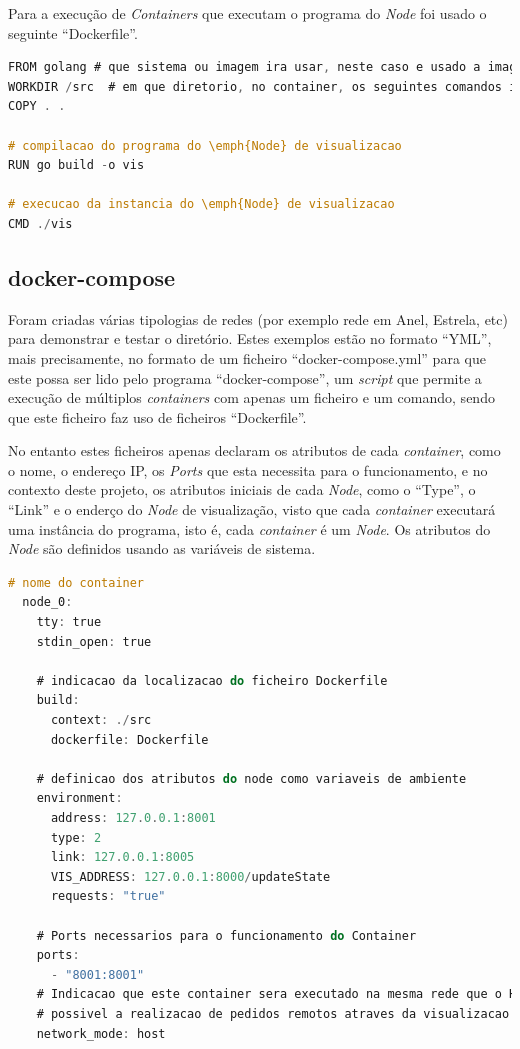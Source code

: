 Para a execução de \emph{Containers} que executam o programa do \emph{Node} foi usado o seguinte ``Dockerfile''.
\begin{lstlisting}[caption={``Dockerfile'' do \emph{Node}},language=C]
FROM golang # que sistema ou imagem ira usar, neste caso e usado a imagem ``golang''
WORKDIR /src  # em que diretorio, no container, os seguintes comandos irao ser executados
COPY . .

# compilacao do programa do \emph{Node} de visualizacao
RUN go build -o vis

# execucao da instancia do \emph{Node} de visualizacao
CMD ./vis

\end{lstlisting}

\subsection*{docker-compose}

Foram criadas várias tipologias de redes (por exemplo rede em Anel, Estrela, etc) para demonstrar e testar o diretório.
Estes exemplos estão no formato ``YML'', mais precisamente, no formato de um ficheiro ``docker-compose.yml'' para que este possa ser lido pelo programa ``docker-compose'', um \emph{script} que permite a execução de múltiplos \emph{containers} com apenas um ficheiro e um comando, sendo que este ficheiro faz uso de ficheiros ``Dockerfile''.

No entanto estes ficheiros apenas declaram os atributos de cada \emph{container}, como o nome, o endereço \acs{IP}, os \emph{Ports} que esta necessita para o funcionamento, e no contexto deste projeto, os atributos iniciais de cada \emph{Node}, como o ``Type'', o 
``Link'' e o enderço do \emph{Node} de visualização, visto que cada \emph{container} executará uma instância do programa, isto é, cada \emph{container} é um \emph{Node}. Os atributos do \emph{Node} são definidos usando as variáveis de sistema.


\begin{lstlisting}[caption={Ficheiro docker-compose.yml},language=C]
  # nome do container
  node_0:
    tty: true
    stdin_open: true

    # indicacao da localizacao do ficheiro Dockerfile
    build:
      context: ./src
      dockerfile: Dockerfile

    # definicao dos atributos do node como variaveis de ambiente
    environment:
      address: 127.0.0.1:8001
      type: 2 
      link: 127.0.0.1:8005
      VIS_ADDRESS: 127.0.0.1:8000/updateState
      requests: "true"

    # Ports necessarios para o funcionamento do Container
    ports:
      - "8001:8001"
    # Indicacao que este container sera executado na mesma rede que o Host, isto para que seja
    # possivel a realizacao de pedidos remotos atraves da visualizacao
    network_mode: host
\end{lstlisting}


